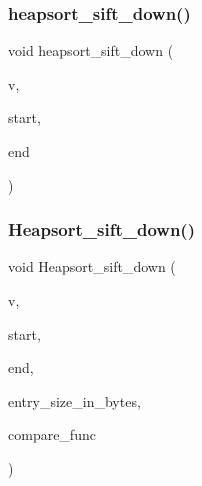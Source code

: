 \mbox{\label{sorting_8_c_a65cbb1a6a3f01f511673705437ddc18b}} 
\subsubsection{\texorpdfstring{heapsort\+\_\+sift\+\_\+down()}{heapsort\_sift\_down()}}
{\footnotesize\ttfamily void heapsort\+\_\+sift\+\_\+down (\begin{DoxyParamCaption}\item[{\mbox{\hyperlink{galois_8h_a09fddde158a3a20bd2dcadb609de11dc}{I\+NT}} $\ast$}]{v,  }\item[{\mbox{\hyperlink{galois_8h_a09fddde158a3a20bd2dcadb609de11dc}{I\+NT}}}]{start,  }\item[{\mbox{\hyperlink{galois_8h_a09fddde158a3a20bd2dcadb609de11dc}{I\+NT}}}]{end }\end{DoxyParamCaption})}

\mbox{\label{sorting_8_c_a89625a5f8e99e9a76db45ad133b5a3f3}} 
\subsubsection{\texorpdfstring{Heapsort\+\_\+sift\+\_\+down()}{Heapsort\_sift\_down()}}
{\footnotesize\ttfamily void Heapsort\+\_\+sift\+\_\+down (\begin{DoxyParamCaption}\item[{void $\ast$}]{v,  }\item[{\mbox{\hyperlink{galois_8h_a09fddde158a3a20bd2dcadb609de11dc}{I\+NT}}}]{start,  }\item[{\mbox{\hyperlink{galois_8h_a09fddde158a3a20bd2dcadb609de11dc}{I\+NT}}}]{end,  }\item[{\mbox{\hyperlink{galois_8h_a09fddde158a3a20bd2dcadb609de11dc}{I\+NT}}}]{entry\+\_\+size\+\_\+in\+\_\+bytes,  }\item[{\mbox{\hyperlink{galois_8h_a09fddde158a3a20bd2dcadb609de11dc}{I\+NT}}($\ast$)(void $\ast$v1, void $\ast$v2)}]{compare\+\_\+func }\end{DoxyParamCaption})}

